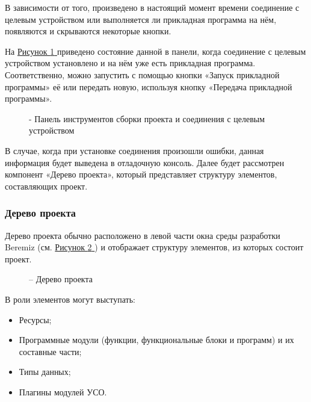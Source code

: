 \documentclass[letterpaper,10pt,russian]{sphinxmanual}
\begin{document}
В зависимости от того, произведено в настоящий момент времени соединение
с целевым устройством или выполняется ли прикладная программа на нём,
появляются и скрываются некоторые кнопки.

На \hyperref[usage_guide/ide_components:image22]{Рисунок \ref{usage_guide/ide_components:image22} } приведено состояние данной в панели, когда соединение с
целевым устройством установлено и на нём уже есть прикладная программа.
Соответственно, можно запустить с помощью кнопки «Запуск прикладной
программы» её или передать новую, используя кнопку «Передача прикладной
программы».
\begin{figure}[htbp]
\centering
\capstart

\noindent{}
\caption{- Панель инструментов сборки проекта и соединения с целевым устройством}\label{usage_guide/ide_components:image22}\end{figure}

В случае, когда при установке соединения произошли ошибки, данная
информация будет выведена в отладочную консоль. Далее
будет рассмотрен компонент «Дерево проекта», который представляет
структуру элементов, составляющих проект.


\subsubsection{Дерево проекта}
\label{usage_guide/ide_components:id3}
Дерево проекта обычно расположено в левой части окна среды разработки
Beremiz (см. \hyperref[usage_guide/ide_components:image23]{Рисунок \ref{usage_guide/ide_components:image23} }) и отображает структуру элементов, из которых
состоит проект.
\begin{figure}[htbp]
\centering
\capstart

\noindent{}
\caption{– Дерево проекта}\label{usage_guide/ide_components:image23}\end{figure}

В роли элементов могут выступать:
\begin{itemize}
\item {} 
Ресурсы;

\item {} 
Программные модули (функции, функциональные блоки и программ) и их
составные части;

\item {} 
Типы данных;

\item {} 
Плагины модулей УСО.

\end{itemize}
\end{document}
